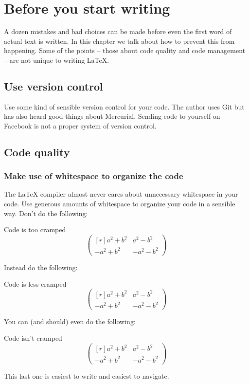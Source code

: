 \chapter{Before you start writing}

A dozen mistakes and bad choices can be made before even the first word of actual text is written.
In this chapter we talk about how to prevent this from happening.
Some of the points -- those about code quality and code management -- are not unique to writing {\LaTeX}.




\section{Use version control}

Use some kind of sensible version control for your code.
The author uses Git but has also heard good things about Mercurial.
Sending code to yourself on Facebook is not a proper system of version control.





\section{Code quality}



\subsection{Make use of whitespace to organize the code}

The {\LaTeX} compiler almost never cares about unnecessary whitespace in your code.
Use generous amounts of whitespace to organize your code in a sensible way.
Don’t do the following:
\begin{showcode}{Code is too cramped}
\[\begin{pmatrix*}[r]a^2+b^2&a^2-b^2\\-a^2+b^2&-a^2-b^2\end{pmatrix*}\]
\end{showcode}
Instead do the following:
\begin{showcode}{Code is less cramped}
\[
  \begin{pmatrix*}[r]
     a^2 + b^2 &  a^2 - b^2 \\
    -a^2 + b^2 & -a^2 - b^2
  \end{pmatrix*}
\]
\end{showcode}
You can (and should) even do the following:
\begin{showcode}{Code isn’t cramped}
\[
  \begin{pmatrix*}[r]
    a^2 + b^2
    &
    a^2 - b^2
    \\
    - a^2 + b^2
    &
    - a^2 - b^2
  \end{pmatrix*}
\]
\end{showcode}
This last one is easiest to write and easiest to navigate.

